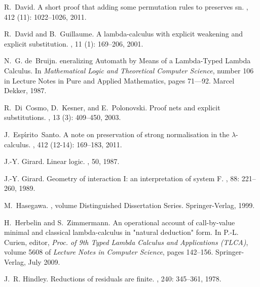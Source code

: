 \documentclass{LMCS}
\renewcommand{\>}{\rightarrow}
\begin{document}
\begin{thebibliography}{10}
R.~David.
\newblock A short proof that adding some permutation rules to preserves sn.
, 412 (11): 1022--1026,
  2011.

R.~David and B.~Guillaume.
\newblock A lambda-calculus with explicit weakening and explicit substitution.
, 11
  (1): 169--206, 2001.

N.~G. de~Bruijn.
eneralizing {A}utomath by {M}eans of a {L}ambda-{T}yped {L}ambda
  {C}alculus.
\newblock In {\em Mathematical Logic and Theoretical Computer Science}, number
  106 in Lecture Notes in Pure and Applied Mathematics, pages 71–--92. Marcel
  Dekker, 1987.

R.~Di~Cosmo, D.~Kesner, and E.~Polonovski.
\newblock Proof nets and explicit substitutions.
, 13
  (3): 409--450, 2003.

J.~Esp\'{\i}rito~Santo.
\newblock A note on preservation of strong normalisation in the
  $\lambda$-calculus.
, 412 (12-14):
  169--183, 2011.

J.-Y. Girard.
\newblock Linear logic.
, 50, 1987.

J.-Y. Girard.
\newblock Geometry of interaction {I}: an interpretation of system {F}.
, 88: 221--260, 1989.

M.~Hasegawa.
, volume Distinguished Dissertation Series.
\newblock Springer-Verlag, 1999.

H.~Herbelin and S.~Zimmermann.
\newblock An operational account of call-by-value minimal and classical
  lambda-calculus in "natural deduction" form.
\newblock In P.-L. Curien, editor, {\em Proc. of 9th Typed Lambda Calculus and
  Applications (TLCA)}, volume 5608 of {\em Lecture Notes in Computer Science},
  pages 142--156. Springer-Verlag, July 2009.

J.~R. Hindley.
\newblock Reductions of residuals are finite.
,
  240: 345--361, 1978.


\end{thebibliography}
\end{document}

